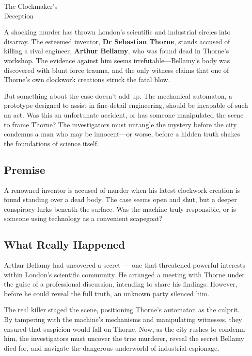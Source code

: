 \begin{WyrdScenarioHeading}{The Clockmaker's\\ Deception}
    \label{scenario:clockmakers-deception}

    A shocking murder has thrown London’s scientific and industrial circles into disarray. The esteemed inventor, \textbf{Dr Sebastian Thorne}, stands accused of killing a rival engineer, \textbf{Arthur Bellamy}, who was found dead in Thorne’s workshop. The evidence against him seems irrefutable—Bellamy’s body was discovered with blunt force trauma, and the only witness claims that one of Thorne’s own clockwork creations struck the fatal blow.

    But something about the case doesn’t add up. The mechanical automaton, a prototype designed to assist in fine-detail engineering, should be incapable of such an act. Was this an unfortunate accident, or has someone manipulated the scene to frame Thorne? The investigators must untangle the mystery before the city condemns a man who may be innocent—or worse, before a hidden truth shakes the foundations of science itself.

    \subsection*{Premise} 
    A renowned inventor is accused of murder when his latest clockwork creation is found standing over a dead body. The case seems open and shut, but a deeper conspiracy lurks beneath the surface. Was the machine truly responsible, or is someone using technology as a convenient scapegoat?

    \subsection*{What Really Happened} 
    Arthur Bellamy had uncovered a secret — one that threatened powerful interests within London’s scientific community. He arranged a meeting with Thorne under the guise of a professional discussion, intending to share his findings. However, before he could reveal the full truth, an unknown party silenced him.

    The real killer staged the scene, positioning Thorne’s automaton as the culprit. By tampering with the machine’s mechanisms and manipulating witnesses, they ensured that suspicion would fall on Thorne. Now, as the city rushes to condemn him, the investigators must uncover the true murderer, reveal the secret Bellamy died for, and navigate the dangerous underworld of industrial espionage.
\end{WyrdScenarioHeading}

